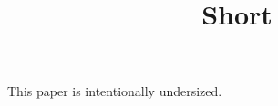 \documentclass{article}
\begin{document}
\title{Short}
\maketitle
This paper is intentionally undersized.
\end{document}
